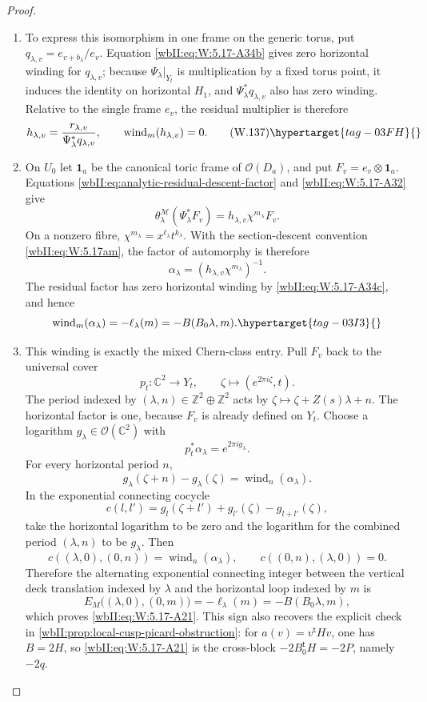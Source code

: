 \begin{proof}
\begin{enumerate}[label={$\langle1\rangle$\arabic*.},leftmargin=*]
\item To express this isomorphism in one frame on the generic torus, put
\(q_{\lambda,v}=e_{v+b_\lambda}/e_v\).  Equation \eqref{wbII:eq:W:5.17-A34b} gives zero
horizontal winding for \(q_{\lambda,v}\); because
\(\Psi_\lambda|_{Y_t}\) is multiplication by a fixed torus point, it
induces the identity on horizontal \(H_1\), and
\(\Psi_\lambda^*q_{\lambda,v}\) also has zero winding.  Relative to the
single frame \(e_v\), the residual multiplier is therefore
\[
 h_{\lambda,v}
 =\frac{r_{\lambda,v}}{\Psi_\lambda^*q_{\lambda,v}},
 \qquad
 \operatorname{wind}_m(h_{\lambda,v})=0.
\tag{W.137}\hypertarget{tag-03FH}{}\label{wbII:eq:W:5.17-A34c}
\]

\item On \(U_0\) let \(\mathbf1_a\) be the canonical toric frame of
\(\mathcal O(D_a)\), and put \(F_v=e_v\otimes\mathbf1_a\).  Equations
\cref{wbII:eq:analytic-residual-descent-factor} and \eqref{wbII:eq:W:5.17-A32} give
\[
 \theta^{\mathcal M}_\lambda(\Psi_\lambda^*F_v)
 =h_{\lambda,v}\chi^{m_\lambda}F_v.
\]
On a nonzero fibre, \(\chi^{m_\lambda}=x^{\ell_\lambda}t^{k_\lambda}\).
With the section-descent convention \eqref{wbII:eq:W:5.17am}, the factor of automorphy is
therefore
\[
 \alpha_\lambda=(h_{\lambda,v}\chi^{m_\lambda})^{-1}.
\]
The residual factor has zero horizontal winding by \eqref{wbII:eq:W:5.17-A34c}, and hence
\begin{equation}
 \operatorname{wind}_m(\alpha_\lambda)
 =-\ell_\lambda(m)=-B(B_0\lambda,m).
\hypertarget{tag-03I3}{}\label{wbII:eq:analytic-factor-horizontal-winding}
\end{equation}

\item This winding is exactly the mixed Chern-class entry.  Pull \(F_v\) back to
the universal cover
\[
 p_t:\mathbb C^2\longrightarrow Y_t,
 \qquad \zeta\longmapsto(e^{2\pi i\zeta},t).
\]
The period indexed by \((\lambda,n)\in\mathbb Z^2\oplus\mathbb Z^2\)
acts by \(\zeta\mapsto\zeta+Z(s)\lambda+n\).  The horizontal factor is one,
because \(F_v\) is already defined on \(Y_t\).  Choose a logarithm
\(g_\lambda\in\mathcal O(\mathbb C^2)\) with
\[
 p_t^*\alpha_\lambda=e^{2\pi i g_\lambda}.
\]
For every horizontal period \(n\),
\[
 g_\lambda(\zeta+n)-g_\lambda(\zeta)
 =\operatorname{wind}_n(\alpha_\lambda).
\]
In the exponential connecting cocycle
\[
 c(l,l')=g_l(\zeta+l')+g_{l'}(\zeta)-g_{l+l'}(\zeta),
\]
take the horizontal logarithm to be zero and the logarithm for the combined
period \((\lambda,n)\) to be \(g_\lambda\).  Then
\[
 c((\lambda,0),(0,n))
 =\operatorname{wind}_n(\alpha_\lambda),
 \qquad
 c((0,n),(\lambda,0))=0.
\]
Therefore the alternating exponential connecting integer between
the vertical deck
translation indexed by \(\lambda\) and the horizontal loop indexed by
\(m\) is
\[
 E_M\bigl((\lambda,0),(0,m)\bigr)
 =-\ell_\lambda(m)
 =-B(B_0\lambda,m),
\]
which proves \eqref{wbII:eq:W:5.17-A21}.  This sign also recovers the explicit check in
\cref{wbII:prop:local-cusp-picard-obstruction}: for
\(a(v)=v^{\mathsf t}Hv\), one has \(B=2H\), so \eqref{wbII:eq:W:5.17-A21} is the
cross-block \(-2B_0^{\mathsf t}H=-2P\), namely \(-2q\).


\end{enumerate}
\end{proof}
